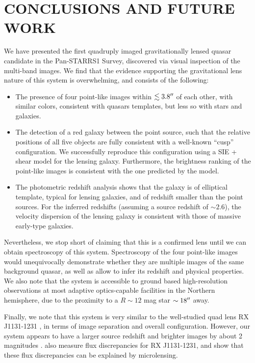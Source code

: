\documentclass[manuscript]{aastex}
\begin{document}
\section{CONCLUSIONS AND FUTURE WORK}

We have presented the first quadruply imaged gravitationally lensed quasar candidate in the Pan-STARRS1 Survey, discovered via visual inspection of the multi-band images. We find that the evidence supporting the gravitational lens nature of this system is overwhelming, and consists of the following:

\begin{itemize}
\item The presence of four point-like images within $\lesssim 3.8\mbox{$^{\prime\prime}$}$ of each other, with similar colors, consistent with quasars templates, but less so with stars and galaxies.
\item The detection of a red galaxy between the point source, such that the relative positions of all five objects are fully consistent with a well-known ``cusp'' configuration. We successfully reproduce this configuration using a SIE + shear model for the lensing galaxy. Furthermore, the brightness ranking of the point-like images is consistent with the one predicted by the model.
 \item The photometric redshift analysis shows that the galaxy is of elliptical template, typical for lensing galaxies, and of redshift smaller than the point sources. For the inferred redshifts (assuming a source redshift of $\sim2.6$), the velocity dispersion of the lensing galaxy is consistent with those of massive early-type galaxies.
\end{itemize}

Nevertheless, we stop short of claiming that this is a confirmed lens until we can obtain spectroscopy of this system. Spectroscopy of the four point-like images would unequivocally demonstrate whether they are multiple images of the same background quasar, as well as allow to infer its redshift and physical properties. We also note that the system is accessible to ground based high-resolution observations at most adaptive optics-capable facilities in the Northern hemisphere, due to the proximity to a $R\sim12$ mag star $\sim18\mbox{$^{\prime\prime}$}$ away.

Finally, we note that this system is very similar to the well-studied quad lens RX J1131-1231 \citep{slu03}, in terms of image separation and overall configuration. However, our system appears to have a larger source redshift and brighter images by about 2 magnitudes \citep{slu06}. \citet{slu08} also measure flux discrepancies for RX J1131-1231, and show that these flux discrepancies can be explained by microlensing. 
\end{document}
